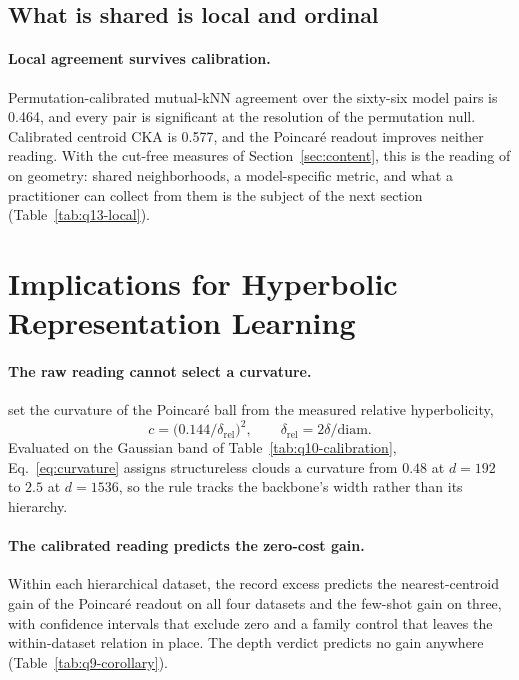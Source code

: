 \documentclass{article}
\theoremstyle{definition}
\theoremstyle{plain}
\theoremstyle{remark}
\begin{document}
\subsection{What is shared is local and ordinal}
\label{sec:v3-local}

\paragraph{Local agreement survives calibration.} Permutation-calibrated mutual-kNN agreement over the sixty-six model pairs is 0.464, and every pair is significant at the resolution of the permutation null. Calibrated centroid CKA is 0.577, and the Poincar\'{e} readout improves neither reading. With the cut-free measures of Section~\ref{sec:content}, this is the reading of \citet{groger2026aristotelian} on geometry: shared neighborhoods, a model-specific metric, and what a practitioner can collect from them is the subject of the next section (Table~\ref{tab:q13-local}). %

\section{Implications for Hyperbolic Representation Learning}
\label{sec:practice}

\paragraph{The raw reading cannot select a curvature.} \citet{Khrulkov_2020_CVPR} set the curvature of the Poincar\'{e} ball from the measured relative hyperbolicity,
\begin{equation}
c=\big(0.144/\delta_{\text{rel}}\big)^{2},\qquad \delta_{\text{rel}}=2\delta/\mathrm{diam}.
\label{eq:curvature}
\end{equation}
Evaluated on the Gaussian band of Table~\ref{tab:q10-calibration}, Eq.~\ref{eq:curvature} assigns structureless clouds a curvature from $0.48$ at $d{=}192$ to $2.5$ at $d{=}1536$, so the rule tracks the backbone's width rather than its hierarchy. %

\paragraph{The calibrated reading predicts the zero-cost gain.} Within each hierarchical dataset, the record excess predicts the nearest-centroid gain of the Poincar\'{e} readout on all four datasets and the few-shot gain on three, with confidence intervals that exclude zero and a family control that leaves the within-dataset relation in place. The depth verdict predicts no gain anywhere (Table~\ref{tab:q9-corollary}). %
\end{document}
